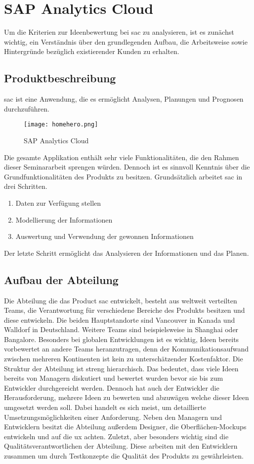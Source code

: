 \newpage
\section{SAP Analytics Cloud}\label{sec:sac}
Um die Kriterien zur Ideenbewertung bei \ac{sac} zu analysieren, ist es zunächst 
wichtig, ein Verständnis über den grundlegenden Aufbau, die Arbeitsweise sowie Hintergründe bezüglich 
existierender Kunden zu erhalten. 

\subsection{Produktbeschreibung}
\ac{sac} ist eine Anwendung, die es ermöglicht Analysen, Planungen und Prognosen durchzuführen. 
\begin{figure}[h]
	\centering 
	\texttt{[image: homehero.png]}
	\caption{SAP Analytics Cloud}
	\label{img:homeHeroSAC}
\end{figure}
Die gesamte Applikation enthält sehr viele Funktionalitäten, die den Rahmen dieser Seminararbeit sprengen würden. Dennoch ist
es sinnvoll Kenntnis über die Grundfunktionalitäten des Produkts zu besitzen. 
Grundsätzlich arbeitet \ac{sac} in drei Schritten. 

\begin{enumerate}
    \item Daten zur Verfügung stellen
    \item Modellierung der Informationen
    \item Auswertung und Verwendung der gewonnen Informationen 
\end{enumerate}
Der letzte Schritt ermöglicht das Analysieren der Informationen und das Planen. 

\subsection{Aufbau der Abteilung}
Die Abteilung die das Product \ac{sac} entwickelt, besteht aus weltweit verteilten Teams, 
die Verantwortung für verschiedene Bereiche des Produkts besitzen und diese entwickeln. 
Die beiden Hauptstandorte sind Vancouver in Kanada und Walldorf in Deutschland. Weitere Teams sind beispielsweise in 
Shanghai oder Bangalore. Besonders bei globalen Entwicklungen ist es wichtig, Ideen bereits vorbewertet an andere Teams 
heranzutragen, denn der Kommunikationsaufwand zwischen mehreren Kontinenten ist kein zu unterschätzender Kostenfaktor. 
Die Struktur der Abteilung ist streng hierarchisch. Das bedeutet, dass viele Ideen bereits von Managern diskutiert und 
bewertet wurden bevor sie bis zum Entwickler durchgereicht werden. Dennoch hat auch der Entwickler die Herausforderung, 
mehrere Ideen zu bewerten und abzuwägen welche dieser Ideen umgesetzt werden soll. Dabei handelt es sich meist, um detaillierte Umsetzungsmöglichkeiten
einer Anforderung. 
Neben den Managern und Entwicklern besitzt die Abteilung außerdem Designer, die Oberflächen-Mockups entwickeln und auf
die \ac{ux} achten. Zuletzt, aber besonders wichtig sind die Qualitätsverantwortlichen der Abteilung. Diese 
arbeiten mit den Entwicklern zusammen um durch Testkonzepte die Qualität des Produkts zu gewährleisten.

